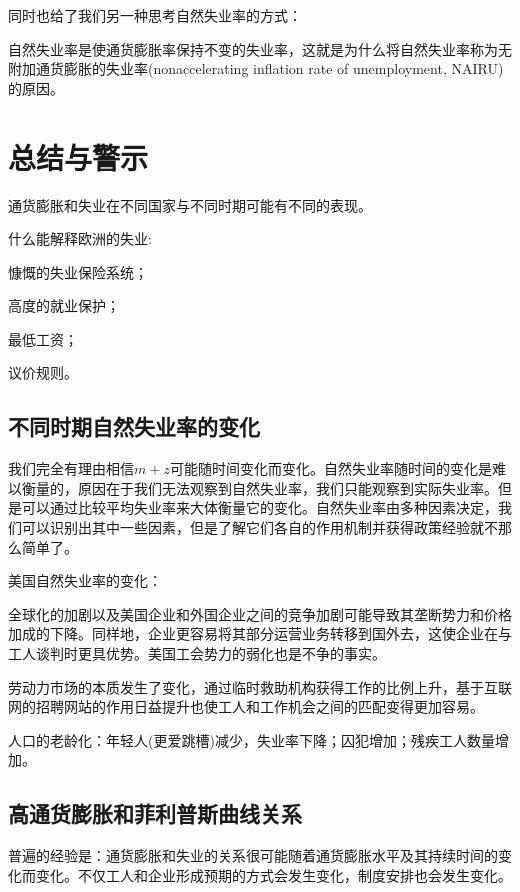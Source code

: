 \documentclass{article}
\begin{document}
同时也给了我们另一种思考自然失业率的方式：

自然失业率是使通货膨胀率保持不变的失业率，这就是为什么将自然失业率称为无附加通货膨胀的失业率(nonaccelerating inflation rate of unemployment, NAIRU)的原因。

\section{总结与警示}

通货膨胀和失业在不同国家与不同时期可能有不同的表现。

什么能解释欧洲的失业:

慷慨的失业保险系统；

高度的就业保护；

最低工资；

议价规则。

%


\subsection{不同时期自然失业率的变化}

我们完全有理由相信$ m+z $可能随时间变化而变化。自然失业率随时间的变化是难以衡量的，原因在于我们无法观察到自然失业率，我们只能观察到实际失业率。但是可以通过比较平均失业率来大体衡量它的变化。自然失业率由多种因素决定，我们可以识别出其中一些因素，但是了解它们各自的作用机制并获得政策经验就不那么简单了。

\hspace*{\fill}

美国自然失业率的变化：

全球化的加剧以及美国企业和外国企业之间的竞争加剧可能导致其垄断势力和价格加成的下降。同样地，企业更容易将其部分运营业务转移到国外去，这使企业在与工人谈判时更具优势。美国工会势力的弱化也是不争的事实。

劳动力市场的本质发生了变化，通过临时救助机构获得工作的比例上升，基于互联网的招聘网站的作用日益提升也使工人和工作机会之间的匹配变得更加容易。

人口的老龄化：年轻人(更爱跳槽)减少，失业率下降；囚犯增加；残疾工人数量增加。

\subsection{高通货膨胀和菲利普斯曲线关系}

普遍的经验是：通货膨胀和失业的关系很可能随着通货膨胀水平及其持续时间的变化而变化。不仅工人和企业形成预期的方式会发生变化，制度安排也会发生变化。
\end{document}
